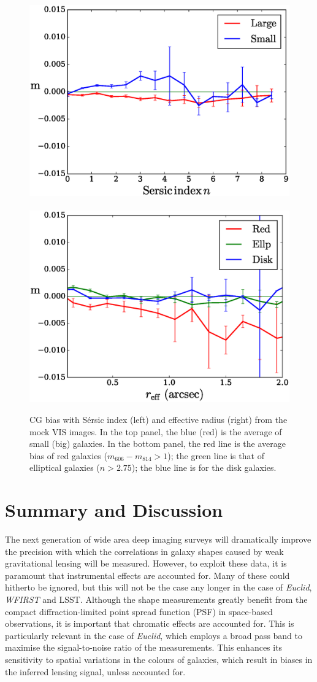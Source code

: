 \documentclass[useAMS,usenatbib]{mnras}
\begin{document}
\begin{figure}
\hbox{%
\includegraphics[width=0.5\hsize]{z2s-ne29.eps}
\includegraphics[width=0.5\hsize]{z2nscl-re29.eps}}
\caption{CG bias with S{\'e}rsic index (left) and effective radius (right)
  from the mock VIS images.
  In the top panel, the blue (red) is the average of small
  (big) galaxies. In the bottom panel, the red line is the average bias of
  red galaxies ($m_{606}-m_{814}>1$); the green line is that of elliptical
  galaxies ($n>2.75$); the blue line is for the disk galaxies.}
\label{fig:cg2re}
\end{figure}
%

\section{Summary and Discussion}

The next generation of wide area deep imaging surveys will dramatically improve the precision with which the correlations in galaxy shapes caused by weak gravitational lensing will be measured. However, to exploit these data, it is paramount that instrumental effects are accounted for. Many of these could hitherto be ignored, but this will not be the case any longer in the case of {\it Euclid}, {\it WFIRST} and LSST.
Although the shape measurements greatly benefit from the compact diffraction-limited point spread function (PSF) in space-based observations, it is important that chromatic effects are accounted for. This is particularly relevant in the case of {\it Euclid}, which employs a broad pass band to maximise the signal-to-noise ratio of the measurements. This enhances its sensitivity to spatial variations in the colours of galaxies,
which result in biases in the inferred lensing signal, unless accounted for.
\end{document}
